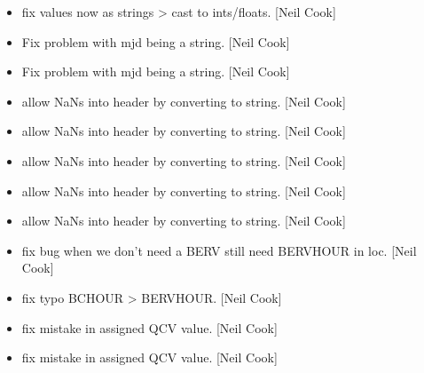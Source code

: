 \documentclass[a4paper,10pt,english]{report}
\begin{document}
\begin{itemize}
\item {} 
 \sphinxhyphen{} fix values now as strings \textendash{}\textgreater{} cast to ints/floats.
{[}Neil Cook{]}

\item {} 
Fix problem with mjd being a string. {[}Neil Cook{]}

\item {} 
Fix problem with mjd being a string. {[}Neil Cook{]}

\item {} 
 \sphinxhyphen{} allow NaNs into header by converting to string. {[}Neil
Cook{]}

\item {} 
 \sphinxhyphen{} allow NaNs into header by converting to string. {[}Neil
Cook{]}

\item {} 
 \sphinxhyphen{} allow NaNs into header by converting to string. {[}Neil
Cook{]}

\item {} 
 \sphinxhyphen{} allow NaNs into header by converting to string. {[}Neil
Cook{]}

\item {} 
 \sphinxhyphen{} allow NaNs into header by converting to string. {[}Neil
Cook{]}

\item {} 
 \sphinxhyphen{} fix bug when we don’t need a BERV still need BERVHOUR
in loc. {[}Neil Cook{]}

\item {} 
 \sphinxhyphen{} fix typo BCHOUR \textendash{}\textgreater{} BERVHOUR. {[}Neil Cook{]}

\item {} 
 \sphinxhyphen{} fix mistake in assigned QCV value. {[}Neil Cook{]}

\item {} 
 \sphinxhyphen{} fix mistake in assigned QCV value. {[}Neil Cook{]}

\end{itemize}
\end{document}
